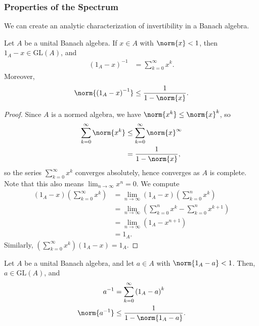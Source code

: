 \documentclass[10pt]{mypackage}
\newcommand{\GL}{\text{GL}}
\begin{document}
\subsubsection{Properties of the Spectrum}%
We can create an analytic characterization of invertibility in a Banach algebra.
\begin{proposition}
  Let $A$ be a unital Banach algebra. If $x\in A$ with $\norm{x} < 1$, then $1_A-x\in \GL\left(A\right)$, and
  \begin{align*}
    \left(1_A - x\right)^{-1} &= \sum_{k=0}^{\infty}x^k.
  \end{align*}
  Moreover,
  \begin{align*}
    \norm{\left(1_A - x\right)^{-1}} \leq \frac{1}{1-\norm{x}}.
  \end{align*}
\end{proposition}
\begin{proof}
  Since $A$ is a normed algebra, we have $\norm{x^k} \leq \norm{x}^k$, so
  \begin{align*}
    \sum_{k=0}^{\infty}\norm{x^k} &\leq \sum_{k=0}^{\infty}\norm{x}^{\infty}\\
                                  &= \frac{1}{1-\norm{x}},
  \end{align*}
  so the series $\sum_{k=0}^{\infty}x^k$ converges absolutely, hence converges as $A$ is complete. Note that this also means $\lim_{n\rightarrow\infty}x^n = 0$. We compute
  \begin{align*}
    \left(1_A - x\right)\left(\sum_{k=0}^{\infty}x^k\right) &= \lim_{n\rightarrow\infty}\left(1_A - x\right)\left(\sum_{k=0}^{n}x^k\right)\\
                                                            &= \lim_{n\rightarrow\infty}\left(\sum_{k=0}^{n}x^k - \sum_{k=0}^{n}x^{k+1}\right)\\
                                                            &= \lim_{n\rightarrow\infty}\left(1_A  - x^{n+1}\right)\\
                                                            &= 1_A.
  \end{align*}
  Similarly, $\left(\sum_{k=0}^{\infty}x^k\right)\left(1_A - x\right) = 1_A$.
\end{proof}
\begin{corollary}
  Let $A$ be a unital Banach algebra, and let $a\in A$ with $\norm{1_A - a} < 1$. Then, $a\in \GL\left(A\right)$, and
  \begin{align*}
    a^{-1} &= \sum_{k=0}^{\infty}\left(1_A - a\right)^k\\
    \norm{a^{-1}} &\leq \frac{1}{1-\norm{1_A - a}}.
  \end{align*}
\end{corollary}
\end{document}
